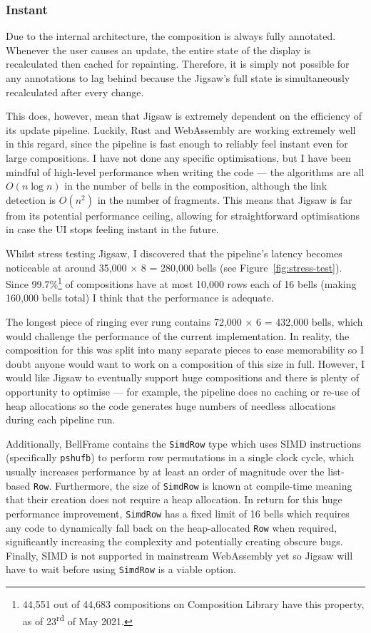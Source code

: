\documentclass[12pt]{article}
\newcommand{\nth}[2]{#1\textsuperscript{#2}}
\begin{document}
\subsubsection{Instant}

Due to the internal architecture, the composition is always fully annotated.  Whenever the user
causes an update, the entire state of the display is recalculated then cached for repainting.
Therefore, it is simply not possible for any annotations to lag behind because the Jigsaw's full
state is simultaneously recalculated after every change.

This does, however, mean that Jigsaw is extremely dependent on the efficiency of its update
pipeline.  Luckily, Rust and WebAssembly are working extremely well in this regard, since the
pipeline is fast enough to reliably feel instant even for large compositions.  I have not done any
specific optimisations, but I have been mindful of high-level performance when writing the code
--- the algorithms are all $O(n \log n)$ in the number of bells in the composition, although the
link detection is $O(n^2)$ in the number of fragments.  This means that Jigsaw is far from its
potential performance ceiling, allowing for straightforward optimisations in case the UI stops
feeling instant in the future.

Whilst stress testing Jigsaw, I discovered that the pipeline's latency becomes noticeable at around 35,000
$\times$ 8 = 280,000 bells (see Figure~\ref{fig:stress-test}).  Since 99.7\%\footnote{44,551 out of
44,683 compositions on Composition Library have this property, as of \nth{23}{rd} of May 2021.} of
compositions have at most 10,000 rows each of 16 bells (making 160,000 bells total) I think that the
performance is adequate.

The longest piece of ringing ever rung contains 72,000 $\times$ 6 = 432,000 bells, which would
challenge the performance of the current implementation.  In reality, the composition for this was
split into many separate pieces to ease memorability so I doubt anyone would want to work on a
composition of this size in full.  However, I would like Jigsaw to eventually support huge
compositions and there is plenty of opportunity to optimise --- for example, the pipeline does no
caching or re-use of heap allocations so the code generates huge numbers of needless allocations
during each pipeline run.

Additionally, BellFrame contains the \verb|SimdRow| type which uses SIMD instructions
(specifically \verb|pshufb|) to perform row permutations in a single clock cycle, which usually
increases performance by at least an order of magnitude over the list-based \verb|Row|.
Furthermore, the size of \verb|SimdRow| is known at compile-time meaning that their creation does
not require a heap allocation.  In return for this huge performance improvement,
\verb|SimdRow| has a fixed limit of 16 bells which requires any code to dynamically fall back on the
heap-allocated \verb|Row| when required, significantly increasing the complexity and potentially
creating obscure bugs.  Finally, SIMD is not supported in mainstream WebAssembly yet so Jigsaw will
have to wait before using \verb|SimdRow| is a viable option.
\end{document}
